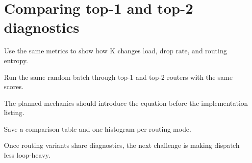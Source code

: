\section{Comparing top-1 and top-2 diagnostics}
\label{sec:ch05-comparing-top-1-and-top-2-diagnostics}

Use the same metrics to show how K changes load, drop rate, and routing entropy.



Run the same random batch through top-1 and top-2 routers with the same scores.



The planned mechanics should introduce the equation before the implementation listing.





\begin{checkpointbox}
Save a comparison table and one histogram per routing mode.
\end{checkpointbox}

Once routing variants share diagnostics, the next challenge is making dispatch less loop-heavy.
